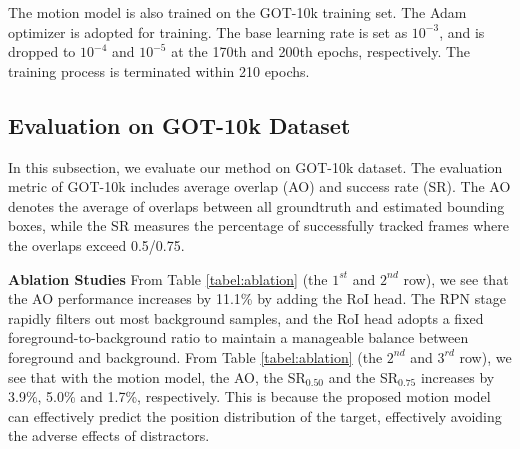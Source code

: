 The motion model is also trained on the GOT-10k training set. The Adam optimizer \cite{kingma2014adam} is adopted for training. The base learning rate is set as $10^{-3}$, and is dropped to $10^{-4}$ and $10^{-5}$ at the 170th and 200th epochs, respectively. The training process is terminated within 210 epochs.

\subsection{Evaluation on GOT-10k Dataset}
In this subsection, we evaluate our method on GOT-10k \cite{huang2018got} dataset.
The evaluation metric of GOT-10k includes average overlap (AO) and success rate (SR). The AO denotes the average of overlaps between all groundtruth and estimated bounding boxes, while the SR measures the percentage of successfully tracked frames where the overlaps exceed 0.5/0.75.

\textbf{Ablation Studies}
From Table \ref{tabel:ablation} (the $1^{st}$ and $2^{nd}$ row), we see that the AO performance increases by 11.1\% by adding the RoI head. The RPN stage rapidly filters out most background samples, and the RoI head adopts a fixed foreground-to-background ratio to maintain a manageable balance between foreground and background.
From Table \ref{tabel:ablation} (the $2^{nd}$ and $3^{rd}$ row), we see that with the motion model, the AO, the SR$_{0.50}$ and the SR$_{0.75}$ increases by 3.9\%, 5.0\% and 1.7\%, respectively. This is because the proposed motion model can effectively predict the position distribution of the target, effectively avoiding the adverse effects of distractors. 

